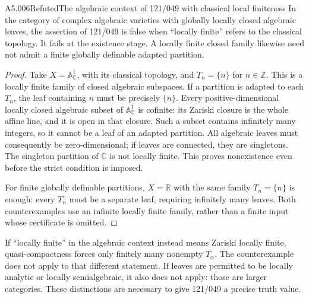 \begin{saresult}{A5.006}{Refuted}{The algebraic context of 121/049 with classical local finiteness}
In the category of complex algebraic varieties with globally
locally closed algebraic leaves, the assertion of 121/049 is false
when ``locally finite'' refers to the classical topology.  It fails
at the existence stage.  A locally finite closed family likewise
need not admit a finite globally definable adapted partition.
\end{saresult}
\begin{proof}
Take $X=\mathbb A^1_{\mathbb C}$, with its classical topology, and
$T_n=\{n\}$ for $n\in\mathbb Z$.  This is a locally finite family
of closed algebraic subspaces.  If a partition is adapted to each
$T_n$, the leaf containing $n$ must be precisely $\{n\}$.
Every positive-dimensional locally closed algebraic subset of
$\mathbb A^1_{\mathbb C}$ is cofinite: its Zariski closure is the
whole affine line, and it is open in that closure.  Such a subset
contains infinitely many integers, so it cannot be a leaf of an
adapted partition.  All algebraic leaves must consequently be
zero-dimensional; if leaves are connected, they are singletons.
The singleton partition of $\mathbb C$ is not locally finite.
This proves nonexistence even before the strict condition is imposed.

For finite globally definable partitions, $X=\mathbb R$ with the
same family $T_n=\{n\}$ is enough: every $T_n$ must be a separate
leaf, requiring infinitely many leaves.  Both counterexamples use
an infinite locally finite family, rather than a finite input whose
certificate is omitted.
\end{proof}

If ``locally finite'' in the algebraic context instead means
Zariski locally finite, quasi-compactness forces only finitely many
nonempty $T_\alpha$.  The counterexample does not apply to that
different statement.  If leaves are permitted to be locally
analytic or locally semialgebraic, it also does not apply: those
are larger categories.  These distinctions are necessary to give
121/049 a precise truth value.


